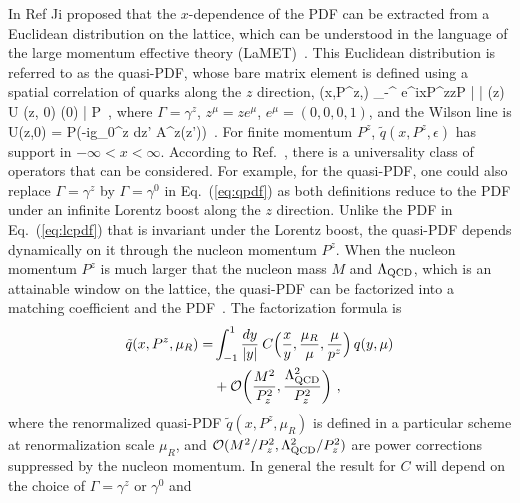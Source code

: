 In Ref {\cite{Ji:2013dva}} Ji proposed that the $x$-dependence of the PDF can be extracted from a Euclidean distribution on the lattice, which can be understood in the language of the large momentum effective theory (LaMET)~\cite{Ji:2014gla}. This Euclidean distribution is referred to as the quasi-PDF, whose bare matrix element is defined using a spatial correlation of quarks along the $z$ direction,
\beq \label{eq:qpdf}
	(x,P^z,\epsilon) \equiv \int_{-\infty}^ e^{ixP^zz}\langle P | \bar{\psi}  (z) \Gamma U (z, 0) \psi (0) | P \rangle \,,
\eeq
where $\Gamma=\gamma^z$, $z^\mu=ze^\mu$, $e^\mu=(0,0,0,1)$, and the Wilson line is
\beq
	U(z,0) = P\exp\left(-ig\int_0^z dz' A^z(z')\right)\ .
\eeq
For finite momentum $P^z$, $\tilde{q}(x,P^z,\epsilon)$ has support in $-\infty < x < \infty$.
According to Ref.~\cite{Hatta:2013gta}, there is a universality class of operators that can be considered. For example, for the quasi-PDF, one could also replace $\Gamma=\gamma^z$ by $\Gamma=\gamma^0$ in Eq.~(\ref{eq:qpdf}) as both definitions reduce to the PDF under an infinite Lorentz boost along the $z$ direction. Unlike the PDF in Eq.~(\ref{eq:lcpdf}) that is invariant under the Lorentz boost, the quasi-PDF depends dynamically on it through the nucleon momentum $P^z$. When the nucleon momentum $P^z$ is much larger that the nucleon mass $M$ and $\Lambda_{\rm QCD}$, which is an attainable window on the lattice, the quasi-PDF can be factorized
into a matching coefficient and the PDF~\cite{Ji:2013dva,Ji:2014gla}. The factorization formula is
\begin{align} \label{eq:momfact}
	\tilde{q}(x,P^z,\mu_R)
	=& \int_{-1}^1 {dy\over |y|}\: C\Bigl({x\over y},{\mu_R\over \mu},{\mu\over p^z}\Bigr) \, q(y,\mu)
	\\
	& + \mathcal{O}\biggl({M^2\over P_z^2},{\Lambda_{\ensuremath{\operatorname{QCD}}}^2\over P_z^2}\biggr)\ ,\nn
\end{align}
where the renormalized quasi-PDF $\tilde{q}(x,P^z,\mu_R)$ is defined in a particular scheme at renormalization scale $\mu_R$, and $\mathcal{O}(M^2/P_z^2, \Lambda_{\rm QCD}^2/P_z^2)$ are power corrections suppressed by the nucleon momentum. In general the result for $C$ will depend on the choice of $\Gamma=\gamma^z$ or $\gamma^0$ and
